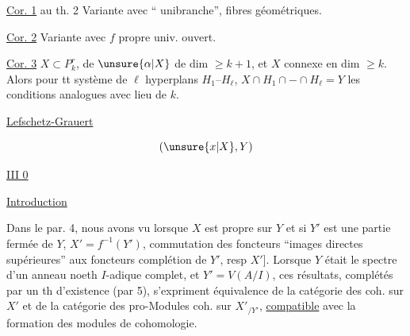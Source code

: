 \uline{Cor. 1} au th. 2 Variante avec  ``  unibranche'',   fibres géométriques.

\uline{Cor. 2} Variante avec $f$ propre univ. ouvert.

\uline{Cor. 3} $X\subset P^r_k$,   de $\unsure{\alpha|X}$ de dim $\geq k+1$, et $X$ connexe en dim $\geq k$. Alors pour tt système de $\ell$ hyperplans $H_1\text{--}H_\ell$,   $X\cap H_1\cap-\cap H_\ell=Y$  les conditions analogues avec  lieu de $k$.


  \uline{Lefschetz-Grauert}

\[
(\unsure{x|X},Y)
\]


\uline{\uline{III} 0}

\uline{Introduction}

Dans le par. 4, nous avons vu  lorsque $X$ est propre sur $Y$     et si $Y'$ est une partie fermée de $Y$, $X'=f^{-1}(Y')$,   commutation des foncteurs  ``images directes supérieures'' aux foncteurs complétion  de $Y'$, resp $X'$]. Lorsque $Y$ était le spectre d'un anneau  noeth $I$-adique complet, et $Y'=V(A/I)$, ces résultats, complétés par un th d'existence (par 5), s'expriment     équivalence de la catégorie des   coh. sur $X'$ et de la catégorie des pro-Modules coh. sur $X'_{/Y'}$, \uline{compatible} avec la formation des modules de cohomologie.


